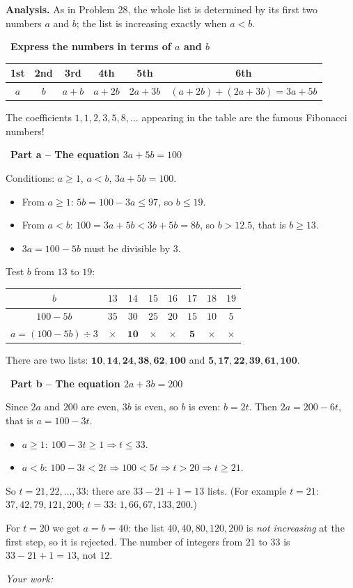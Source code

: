 \documentclass[11pt]{article}
\newif\ifsol \solfalse
\newcommand{\probsol}[1]{%
  \begin{lrbox}{\solmeasure}\begin{minipage}{\dimexpr\linewidth-24pt\relax}#1\end{minipage}\end{lrbox}%
  \ifsol
    \begin{solbox}#1\end{solbox}%
  \else
    \setlength{\solht}{\dimexpr\ht\solmeasure+\dp\solmeasure+0.85cm\relax}%
    \ifdim\solht<1.35cm\setlength{\solht}{1.35cm}\fi
    \ifdim\solht>\StudentMaxWork\setlength{\solht}{\StudentMaxWork}\fi
    \begin{tcolorbox}[colback=white,colframe=Line,boxrule=0.8pt,arc=5pt,
      left=8pt,right=8pt,top=4pt,bottom=4pt,height=\solht]{\footnotesize\color{Slate}\itshape\WorkWord}\end{tcolorbox}%
  \fi}
\newlength{\StudentMaxWork}\setlength{\StudentMaxWork}{7.5cm}
\newcommand{\step}[2]{\par\smallskip\noindent{\bfseries\color{tmBlue!85!black}\StepWord~#1.}\ {\bfseries #2}\par\nopagebreak}
\def\WorkWord{Your work:}
\def\StepWord{Step}
\begin{document}
\probsol{
\textbf{Analysis.} As in Problem 28, the whole list is determined by its first two numbers $a$ and $b$; the list is increasing exactly when $a<b$.

\step{1}{Express the numbers in terms of $a$ and $b$}
\begin{center}\small
\begin{tabular}{|c|c|c|c|c|c|}
\hline
\rowcolor{tmBlue!10}1st & 2nd & 3rd & 4th & 5th & 6th\\ \hline
$a$ & $b$ & $a+b$ & $a+2b$ & $2a+3b$ & $(a+2b)+(2a+3b)=3a+5b$\\ \hline
\end{tabular}
\end{center}
\begin{tipbox}The coefficients $1,1,2,3,5,8,\dots$ appearing in the table are the famous Fibonacci numbers!\end{tipbox}

\step{2}{Part a -- The equation $3a+5b=100$}
Conditions: $a\ge 1$, $a<b$, $3a+5b=100$.
\begin{itemize}[leftmargin=1.3em,itemsep=1pt]
\item From $a\ge 1$: $5b=100-3a\le 97$, so $b\le 19$.
\item From $a<b$: $100=3a+5b<3b+5b=8b$, so $b>12.5$, that is $b\ge 13$.
\item $3a=100-5b$ must be divisible by $3$.
\end{itemize}
Test $b$ from $13$ to $19$:
\begin{center}\small
\begin{tabular}{|c|c|c|c|c|c|c|c|}
\hline
\rowcolor{tmBlue!10}$b$ & $13$ & $14$ & $15$ & $16$ & $17$ & $18$ & $19$\\ \hline
$100-5b$ & $35$ & $30$ & $25$ & $20$ & $15$ & $10$ & $5$\\ \hline
$a=(100-5b)\div 3$ & $\times$ & $\mathbf{10}$ & $\times$ & $\times$ & $\mathbf{5}$ & $\times$ & $\times$\\ \hline
\end{tabular}
\end{center}
There are two lists: $\mathbf{10, 14, 24, 38, 62, 100}$ and $\mathbf{5, 17, 22, 39, 61, 100}$.

\step{3}{Part b -- The equation $2a+3b=200$}
Since $2a$ and $200$ are even, $3b$ is even, so $b$ is even: $b=2t$. Then $2a=200-6t$, that is $a=100-3t$.
\begin{itemize}[leftmargin=1.3em,itemsep=1pt]
\item $a\ge 1$: $100-3t\ge 1 \Rightarrow t\le 33$.
\item $a<b$: $100-3t<2t \Rightarrow 100<5t \Rightarrow t>20 \Rightarrow t\ge 21$.
\end{itemize}
So $t=21,22,\dots,33$: there are $33-21+1=13$ lists. (For example $t=21$: $37, 42, 79, 121, 200$; $t=33$: $1, 66, 67, 133, 200$.)
\begin{warnbox}For $t=20$ we get $a=b=40$: the list $40,40,80,120,200$ is \emph{not increasing} at the first step, so it is rejected. The number of integers from $21$ to $33$ is $33-21+1=13$, not $12$.\end{warnbox}

}
\end{document}
